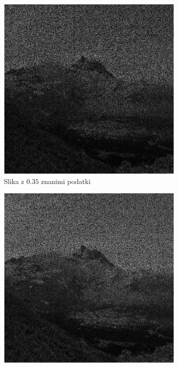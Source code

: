 \begin{figure}[h]
\begin{subfigure}{0.49\linewidth}
        \includegraphics[width=\linewidth]{Poglavja/Slike/grayscale1000/slikaInput35.png}
        \caption{Slika z $0.35$ znanimi podatki}
    \end{subfigure}
    \begin{subfigure}{0.49\linewidth}
        \includegraphics[width=\linewidth]{Poglavja/Slike/grayscale1000/slikaInput45.png}

\end{subfigure}
\end{figure}
